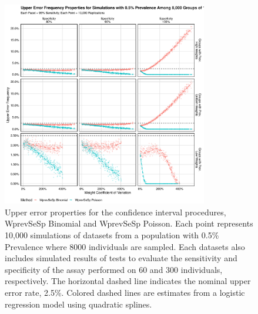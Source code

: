 \documentclass[AMA,STIX1COL]{WileyNJD-v2}
\begin{document}
\begin{figure}
\centering
\includegraphics[width=0.8\textwidth]{figures/imperfect_upper_error_frequency_8000_groups_0_005_prev.pdf}
\caption{Upper error properties for the confidence interval procedures, WprevSeSp Binomial and WprevSeSp Poisson.
Each point represents 10,000 simulations of datasets from a population with 0.5\% Prevalence where 8000 individuals are sampled.
Each datasets also includes simulated results of tests to evaluate the sensitivity and specificity of the assay performed on 60 and 300 individuals, respectively.
The horizontal dashed line indicates the nominal upper error rate, 2.5\%.
Colored dashed lines are estimates from a logistic regression model using quadratic splines.}
\label{fig:imperfect_upper_error_frequency_8000_groups_0_005_prev}
\end{figure}
\end{document}
